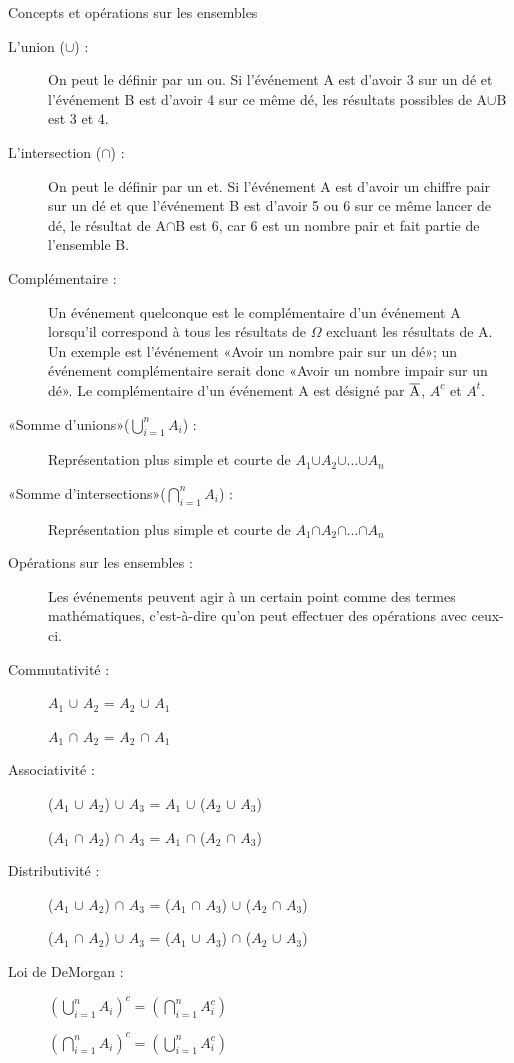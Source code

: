 \documentclass[10pt, french]{article}
\begin{document}
\begin{multicols*}{3}
\begin{probch2}{Concepts et opérations sur les ensembles}
\begin{description}
  \item[L'union ({$\cup$}) :] On peut le définir par un ou. Si l'événement A est d'avoir 3 sur un dé et l'événement B est d'avoir 4 sur ce même dé, les résultats possibles de A{$\cup$}B est 3 et 4.
  \item[L'intersection ({$\cap$}) :] On peut le définir par un et. Si l'événement A est d'avoir un chiffre pair sur un dé et que l'événement B est d'avoir 5 ou 6 sur ce même lancer de dé, le résultat de A{$\cap$}B est 6, car 6 est un nombre pair et fait partie de l'ensemble B. 
  \item[Complémentaire :] Un événement quelconque est le complémentaire d'un événement A lorsqu'il correspond à tous les résultats de $\Omega$ excluant les résultats de A. Un exemple est l'événement «Avoir un nombre pair sur un dé»; un événement complémentaire serait donc «Avoir un nombre impair sur un dé». Le complémentaire d'un événement A est désigné par {$\overline{\rm A}$}, $A^{c}$ et $A^{t}$.
  \item[«Somme d'unions»($\bigcup_{i=1}^{n} A_i$) :] Représentation plus simple et courte de $A_1${$\cup$}$A_2${$\cup$}...{$\cup$}$A_n$
  \item[«Somme d'intersections»($\bigcap_{i=1}^{n} A_i$) :] Représentation plus simple et courte de $A_1${$\cap$}$A_2${$\cap$}...{$\cap$}$A_n$
  \item[Opérations sur les ensembles :] Les événements peuvent agir à un certain point comme des termes mathématiques, c'est-à-dire qu'on peut effectuer des opérations avec ceux-ci.
  \item[Commutativité :] $A_1$ {$\cup$} $A_2$ = $A_2$ {$\cup$} $A_1$
  \item[]$A_1$ {$\cap$} $A_2$ = $A_2$ {$\cap$} $A_1$
  \item[Associativité :] ($A_1$ {$\cup$} $A_2$) {$\cup$} $A_3$ = $A_1$ {$\cup$} ($A_2$ {$\cup$} $A_3$)
  \item[] ($A_1$ {$\cap$} $A_2$) {$\cap$} $A_3$ = $A_1$ {$\cap$} ($A_2$ {$\cap$} $A_3$)
  \item[Distributivité :] ($A_1$ {$\cup$} $A_2$) {$\cap$} $A_3$ = ($A_1$ {$\cap$} $A_3$) {$\cup$} ($A_2$ {$\cap$} $A_3$)
  \item[] ($A_1$ {$\cap$} $A_2$) {$\cup$} $A_3$ = ($A_1$ {$\cup$} $A_3$) {$\cap$} ($A_2$ {$\cup$} $A_3$)
  \item[Loi de DeMorgan :] $(\bigcup_{i = 1}^{n} A_{i})^{c} = (\bigcap_{i=1}^{n} A_i^{c})$
  \item[] $(\bigcap_{i=1}^{n} A_{i})^{c} = (\bigcup_{i=1}^{n} A_i^{c})$
\end{description}
\end{probch2}


\end{multicols*}
\end{document}
